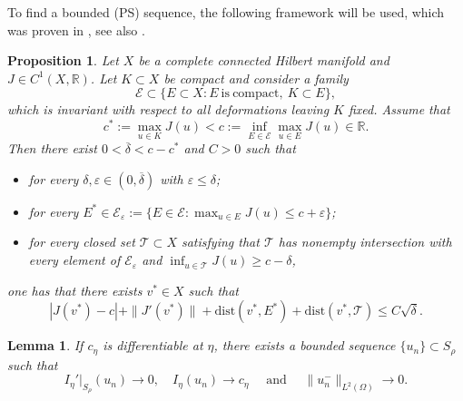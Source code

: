 \documentclass[10pt]{article}
\numberwithin{equation}{section}
\newtheorem{proposition}[theorem]{Proposition}
\newtheorem{lemma}[theorem]{Lemma}
\numberwithin{equation}{section}
\begin{document}
To find a bounded (PS) sequence, the following framework will be used, which was proven in \cite[Theorem 4.5 and Remark 4.10]{Ghoussoub1993}, see also \cite[Lemma 2.1]{Pierotti25}.
\begin{proposition}\label{22072013}
Let $X$ be a complete connected Hilbert manifold and $J\in C^1(X,\mathbb{R})$. Let $K\subset X$ be compact and consider a family
\[
\mathcal{E}\subset \{E\subset X: E ~\text{is}~ \text{compact},~K\subset E \},
\]
which is invariant with respect to all deformations leaving $K$ fixed. Assume that
\[
c^*:=\underset{u\in K}{\max}J(u)<c:=\underset{E\in \mathcal{E}}{\inf}\underset{u\in E}{\max}J(u)\in \mathbb{R}.
\]
Then there exist $0<\overline{\delta}<c-c^*$ and $C>0$ such that
\begin{itemize}
\item for every $\delta, \varepsilon\in (0,\overline{\delta})$ with $\varepsilon\le\delta$;
\item for every $E^*\in \mathcal{E}_{\varepsilon}:=\{E\in\mathcal{E}: \max_{u\in E}J(u)\le c+\varepsilon\}$;
\item for every closed set $\mathcal{T}\subset X$ satisfying that $\mathcal{T}$ has nonempty intersection with every element of $\mathcal{E}_{\varepsilon}$ and $\inf_{u\in \mathcal{T}}J(u)\ge c-\delta$,
\end{itemize}
one has that there exists $v^*\in X$ such that
\begin{equation}\label{2509171922}
|J(v^*)-c|+\|J'(v^*)\|+\mbox{dist}(v^*, E^*)+\mbox{dist}(v^*, \mathcal{T})\le C\sqrt{\delta}.
\end{equation}
\end{proposition}
\begin{lemma}\label{2408312351}
If $c_{\eta}$ is differentiable at $\eta$, there exists a bounded sequence $\{u_n\}\subset S_\rho$ such that
\begin{equation}\label{2408311548}
I_{\eta}'|_{S_\rho}(u_n)\to 0,\quad  I_{\eta}(u_n)\to c_\eta \quad \mbox{ and }\quad \|u_n^{-}\|_{L^2(\Omega)}\to 0.
\end{equation}
\end{lemma}
\end{document}
